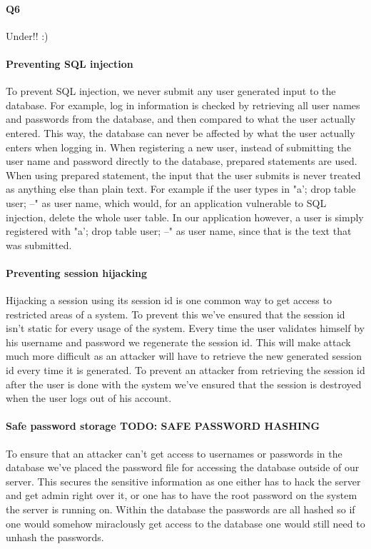\documentclass[11pt, a4paper]{article}
\begin{document}
\paragraph{Q6} Under!! :)
\paragraph{Preventing SQL injection}
To prevent SQL injection, we never submit any user generated input to the database. For example, log in information is checked by retrieving all user names and passwords from the database, and then compared to what the user actually entered. This way, the database can never be affected by what the user actually enters when logging in.
When registering a new user, instead of submitting the user name and password directly to the database, prepared statements are used. When using prepared statement, the input that the user submits is never treated as anything else than plain text. For example if the user types in "a'; drop table user; --" as user name, which would, for an application vulnerable to SQL injection, delete the whole user table. In our application however, a user is simply registered with "a'; drop table user; --" as user name, since that is the text that was submitted.
\paragraph{Preventing session hijacking}
Hijacking a session using its session id is one common way to get access to restricted areas of a system. To prevent this we've ensured that the session id isn't static for every usage of the system. Every time the user validates himself by his username and password we regenerate the session id. This will make attack much more difficult as an attacker will have to retrieve the new generated session id every time it is generated. To prevent an attacker from retrieving the session id after the user is done with the system we've ensured that the session is destroyed when the user logs out of his account. 
\paragraph{Safe password storage TODO: SAFE PASSWORD HASHING}
To ensure that an attacker can't get access to usernames or passwords in the database we've placed the password file for accessing the database outside of our server. This secures the sensitive information as one either has to hack the server and get admin right over it, or one has to have the root password on the system the server is running on. Within the database the passwords are all hashed so if one would somehow miraclously get access to the database one would still need to unhash the passwords. 
\end{document}
